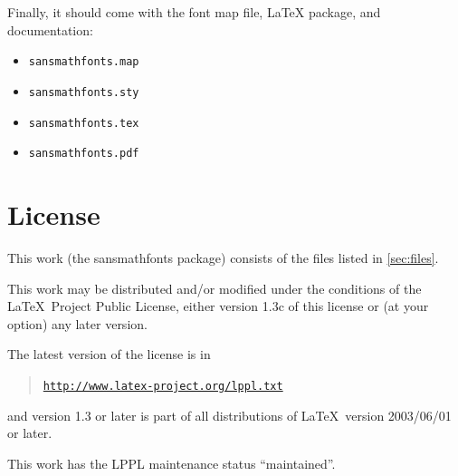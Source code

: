 \documentclass{amsart}
\begin{document}
Finally, it should come with the font map file, LaTeX package, and documentation:

\begin{itemize}[leftmargin=*]
\item \texttt{sansmathfonts.map}
\item \texttt{sansmathfonts.sty}
\item \texttt{sansmathfonts.tex}
\item \texttt{sansmathfonts.pdf}
\end{itemize}





\section{License}

This work (the \textsf{sansmathfonts} package) consists of the
files listed in \autoref{sec:files}.

This work may be distributed and/or modified under the
conditions of the \LaTeX\ Project Public License, either
version 1.3c of this license or (at your option) any
later version.

The latest version of the license is in
\begin{quote}
\href {http://www.latex-project.org/lppl.txt} 
{\texttt{http://www.latex-project.org/lppl.txt}}
\end{quote}
and version 1.3 or later is part of all distributions of
\LaTeX\ version 2003/06/01 or later.

This work has the LPPL maintenance status ``maintained''.
\end{document}
